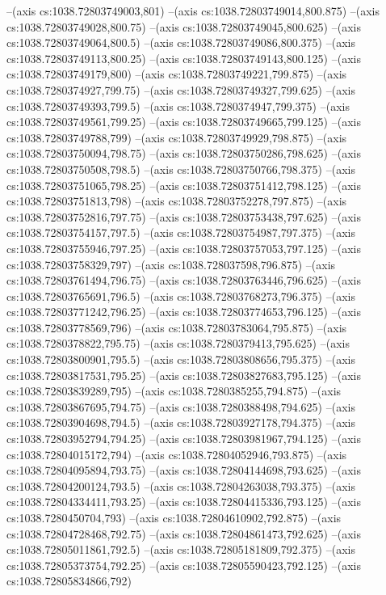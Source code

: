 --(axis cs:1038.72803749003,801)
--(axis cs:1038.72803749014,800.875)
--(axis cs:1038.72803749028,800.75)
--(axis cs:1038.72803749045,800.625)
--(axis cs:1038.72803749064,800.5)
--(axis cs:1038.72803749086,800.375)
--(axis cs:1038.72803749113,800.25)
--(axis cs:1038.72803749143,800.125)
--(axis cs:1038.72803749179,800)
--(axis cs:1038.72803749221,799.875)
--(axis cs:1038.7280374927,799.75)
--(axis cs:1038.72803749327,799.625)
--(axis cs:1038.72803749393,799.5)
--(axis cs:1038.7280374947,799.375)
--(axis cs:1038.72803749561,799.25)
--(axis cs:1038.72803749665,799.125)
--(axis cs:1038.72803749788,799)
--(axis cs:1038.72803749929,798.875)
--(axis cs:1038.72803750094,798.75)
--(axis cs:1038.72803750286,798.625)
--(axis cs:1038.72803750508,798.5)
--(axis cs:1038.72803750766,798.375)
--(axis cs:1038.72803751065,798.25)
--(axis cs:1038.72803751412,798.125)
--(axis cs:1038.72803751813,798)
--(axis cs:1038.72803752278,797.875)
--(axis cs:1038.72803752816,797.75)
--(axis cs:1038.72803753438,797.625)
--(axis cs:1038.72803754157,797.5)
--(axis cs:1038.72803754987,797.375)
--(axis cs:1038.72803755946,797.25)
--(axis cs:1038.72803757053,797.125)
--(axis cs:1038.72803758329,797)
--(axis cs:1038.728037598,796.875)
--(axis cs:1038.72803761494,796.75)
--(axis cs:1038.72803763446,796.625)
--(axis cs:1038.72803765691,796.5)
--(axis cs:1038.72803768273,796.375)
--(axis cs:1038.72803771242,796.25)
--(axis cs:1038.72803774653,796.125)
--(axis cs:1038.72803778569,796)
--(axis cs:1038.72803783064,795.875)
--(axis cs:1038.7280378822,795.75)
--(axis cs:1038.7280379413,795.625)
--(axis cs:1038.72803800901,795.5)
--(axis cs:1038.72803808656,795.375)
--(axis cs:1038.72803817531,795.25)
--(axis cs:1038.72803827683,795.125)
--(axis cs:1038.72803839289,795)
--(axis cs:1038.7280385255,794.875)
--(axis cs:1038.72803867695,794.75)
--(axis cs:1038.7280388498,794.625)
--(axis cs:1038.72803904698,794.5)
--(axis cs:1038.72803927178,794.375)
--(axis cs:1038.72803952794,794.25)
--(axis cs:1038.72803981967,794.125)
--(axis cs:1038.72804015172,794)
--(axis cs:1038.72804052946,793.875)
--(axis cs:1038.72804095894,793.75)
--(axis cs:1038.72804144698,793.625)
--(axis cs:1038.72804200124,793.5)
--(axis cs:1038.72804263038,793.375)
--(axis cs:1038.72804334411,793.25)
--(axis cs:1038.72804415336,793.125)
--(axis cs:1038.7280450704,793)
--(axis cs:1038.72804610902,792.875)
--(axis cs:1038.72804728468,792.75)
--(axis cs:1038.72804861473,792.625)
--(axis cs:1038.72805011861,792.5)
--(axis cs:1038.72805181809,792.375)
--(axis cs:1038.72805373754,792.25)
--(axis cs:1038.72805590423,792.125)
--(axis cs:1038.72805834866,792)
